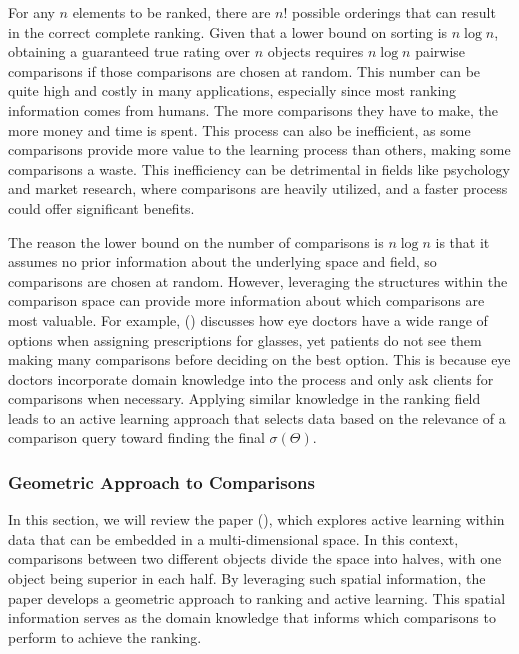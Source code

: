 \documentclass[
  letterpaper,
  numbers=noenddot,
  DIV=11]{scrreprt}
\theoremstyle{plain}
\theoremstyle{definition}
\theoremstyle{plain}
\theoremstyle{remark}
\begin{document}
For any \(n\) elements to be ranked, there are \(n!\) possible orderings
that can result in the correct complete ranking. Given that a lower
bound on sorting is \(n\log n\), obtaining a guaranteed true rating over
\(n\) objects requires \(n\log n\) pairwise comparisons if those
comparisons are chosen at random. This number can be quite high and
costly in many applications, especially since most ranking information
comes from humans. The more comparisons they have to make, the more
money and time is spent. This process can also be inefficient, as some
comparisons provide more value to the learning process than others,
making some comparisons a waste. This inefficiency can be detrimental in
fields like psychology and market research, where comparisons are
heavily utilized, and a faster process could offer significant benefits.

The reason the lower bound on the number of comparisons is \(n\log n\)
is that it assumes no prior information about the underlying space and
field, so comparisons are chosen at random. However, leveraging the
structures within the comparison space can provide more information
about which comparisons are most valuable. For example,
() discusses how eye doctors
have a wide range of options when assigning prescriptions for glasses,
yet patients do not see them making many comparisons before deciding on
the best option. This is because eye doctors incorporate domain
knowledge into the process and only ask clients for comparisons when
necessary. Applying similar knowledge in the ranking field leads to an
active learning approach that selects data based on the relevance of a
comparison query toward finding the final \(\sigma(\Theta)\).

\subsubsection*{Geometric Approach to
Comparisons}\label{geometric-approach-to-comparisons}

In this section, we will review the paper (), which explores active learning within data that can be
embedded in a multi-dimensional space. In this context, comparisons
between two different objects divide the space into halves, with one
object being superior in each half. By leveraging such spatial
information, the paper develops a geometric approach to ranking and
active learning. This spatial information serves as the domain knowledge
that informs which comparisons to perform to achieve the ranking.
\end{document}
